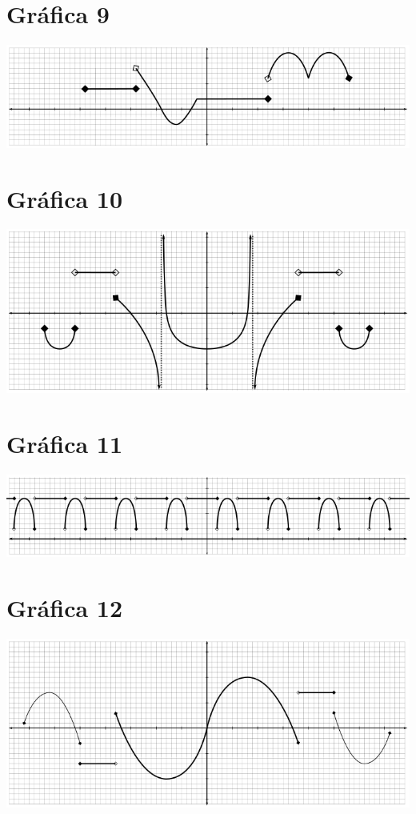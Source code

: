 \section{Gráfica 9}
\includegraphics{../img/graficas-funciones-9.png}

\section{Gráfica 10}
\includegraphics{../img/graficas-funciones-10.png}

\section{Gráfica 11}
\includegraphics{../img/graficas-funciones-11.png}

\section{Gráfica 12}
\includegraphics{../img/graficas-funciones-12.png}


\twocolumn